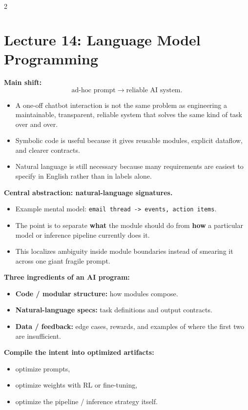 \documentclass[10pt]{article}
\begin{document}
\begin{multicols*}{2}
\section*{Lecture 14: Language Model Programming}
\textbf{Main shift:}
\[
\text{ad-hoc prompt} \rightarrow \text{reliable AI system}.
\]

\begin{itemize}
\item A one-off chatbot interaction is not the same problem as engineering a maintainable, transparent, reliable system that solves the same kind of task over and over.
\item Symbolic code is useful because it gives reusable modules, explicit dataflow, and clearer contracts.
\item Natural language is still necessary because many requirements are easiest to specify in English rather than in labels alone.
\end{itemize}

\textbf{Central abstraction: natural-language signatures.}
\begin{itemize}
\item Example mental model: \texttt{email thread -> events, action items}.
\item The point is to separate \textbf{what} the module should do from \textbf{how} a particular model or inference pipeline currently does it.
\item This localizes ambiguity inside module boundaries instead of smearing it across one giant fragile prompt.
\end{itemize}

\textbf{Three ingredients of an AI program:}
\begin{itemize}
\item \textbf{Code / modular structure:} how modules compose.
\item \textbf{Natural-language specs:} task definitions and output contracts.
\item \textbf{Data / feedback:} edge cases, rewards, and examples of where the first two are insufficient.
\end{itemize}

\textbf{Compile the intent into optimized artifacts:}
\begin{itemize}
\item optimize prompts,
\item optimize weights with RL or fine-tuning,
\item optimize the pipeline / inference strategy itself.
\end{itemize}


\end{multicols*}
\end{document}

